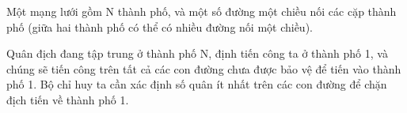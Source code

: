 Một mạng lưới gồm N thành phố, và một số đường một chiều nối các cặp thành phố (giữa hai thành phố có thể có nhiều đường nối một chiều).   


   Quân địch đang tập trung ở thành phố N, định tiến công ta ở thành phố 1, và chúng sẽ tiến công trên tất cả các con đường chưa được bảo vệ để tiến vào thành phố 1. Bộ chỉ huy ta cần xác định số quân ít nhất trên các con đường để chặn địch tiến về thành phố 1.